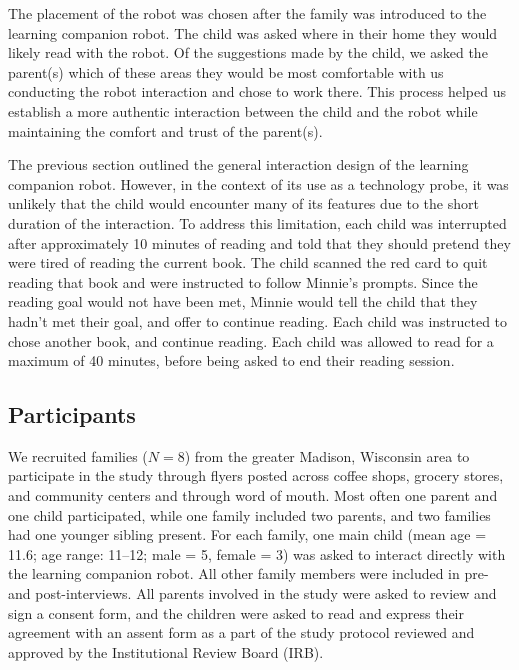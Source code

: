 \documentclass{sigchi}
\begin{document}
The placement of the robot was chosen after the family was introduced to the learning companion robot. The child was asked where in their home they would likely read with the robot. Of the suggestions made by the child, we asked the parent(s) which of these areas they would be most comfortable with us conducting the robot interaction and chose to work there. This process helped us establish a more authentic interaction between the child and the robot while maintaining the comfort and trust of the parent(s).

The previous section outlined the general interaction design of the learning companion robot. However, in the context of its use as a technology probe, it was unlikely that the child would encounter many of its features due to the short duration of the interaction. To address this limitation, each child was interrupted after approximately 10 minutes of reading and told that they should pretend they were tired of reading the current book. The child scanned the red card to quit reading that book and were instructed to follow Minnie's prompts. Since the reading goal would not have been met, Minnie would tell the child that they hadn't met their goal, and offer to continue reading. Each child was instructed to chose another book, and continue reading. Each child was allowed to read for a maximum of 40 minutes, before being asked to end their reading session.


\subsection{Participants}
 We recruited families ($N=8$) from {\color{Purple}the greater Madison, Wisconsin area} to participate in the study through flyers posted across coffee shops, grocery stores, and community centers and through word of mouth. Most often one parent and one child participated, while one family included two parents, and two families had one younger sibling present. For each family, one main child (mean age = 11.6; age range: 11--12; male = 5, female = 3) was asked to interact directly with the learning companion robot. All other family members were included in pre- and post-interviews. All parents involved in the study were asked to review and sign a consent form, and the children were asked to read and express their agreement with an assent form as a part of the study protocol reviewed and approved by the Institutional Review Board (IRB).
\end{document}
